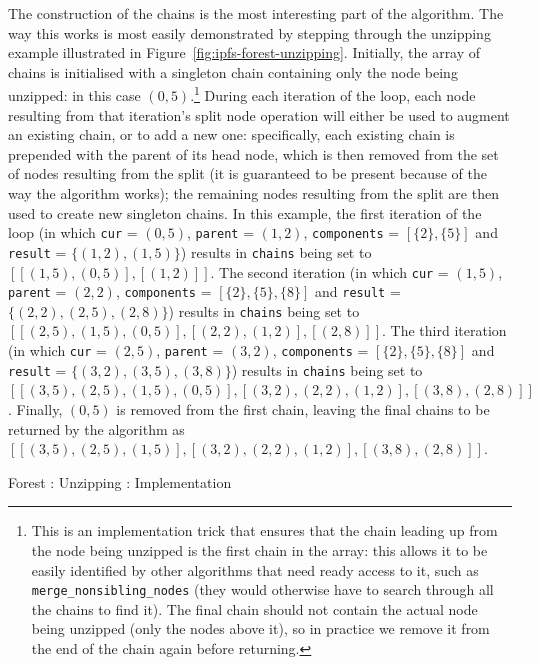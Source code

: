 The construction of the chains is the most interesting part of the algorithm. The way this works is most easily demonstrated by stepping through the unzipping example illustrated in Figure~\ref{fig:ipfs-forest-unzipping}. Initially, the array of chains is initialised with a singleton chain containing only the node being unzipped: in this case $(0,5)$.\footnote{This is an implementation trick that ensures that the chain leading up from the node being unzipped is the first chain in the array: this allows it to be easily identified by other algorithms that need ready access to it, such as \texttt{merge_nonsibling_nodes} (they would otherwise have to search through all the chains to find it). The final chain should not contain the actual node being unzipped (only the nodes above it), so in practice we remove it from the end of the chain again before returning.} During each iteration of the loop, each node resulting from that iteration's split node operation will either be used to augment an existing chain, or to add a new one: specifically, each existing chain is prepended with the parent of its head node, which is then removed from the set of nodes resulting from the split (it is guaranteed to be present because of the way the algorithm works); the remaining nodes resulting from the split are then used to create new singleton chains. In this example, the first iteration of the loop (in which \texttt{cur} = $(0,5)$, \texttt{parent} = $(1,2)$, \texttt{components} = $[\{2\}, \{5\}]$ and \texttt{result} = $\{(1,2), (1,5)\}$) results in \texttt{chains} being set to $[[(1,5), (0,5)], [(1,2)]]$. The second iteration (in which \texttt{cur} = $(1,5)$, \texttt{parent} = $(2,2)$, \texttt{components} = $[\{2\}, \{5\}, \{8\}]$ and \texttt{result} = $\{(2,2), (2,5), (2,8)\}$) results in \texttt{chains} being set to $[[(2,5), (1,5), (0,5)], [(2,2), (1,2)], [(2,8)]]$. The third iteration (in which \texttt{cur} = $(2,5)$, \texttt{parent} = $(3,2)$, \texttt{components} = $[\{2\}, \{5\}, \{8\}]$ and \texttt{result} = $\{(3,2), (3,5), (3,8)\}$) results in \texttt{chains} being set to $[[(3,5), (2,5), (1,5), (0,5)], [(3,2), (2,2), (1,2)], [(3,8), (2,8)]]$. Finally, $(0,5)$ is removed from the first chain, leaving the final chains to be returned by the algorithm as $[[(3,5), (2,5), (1,5)], [(3,2), (2,2), (1,2)], [(3,8), (2,8)]]$.

\begin{stulisting}[p]
\caption{Forest : Unzipping : Implementation}
\label{code:ipfs-forest-unzipnode}

\end{stulisting}

